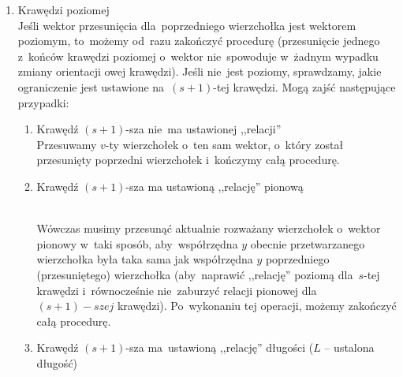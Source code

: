 \documentclass[11pt, a4paper]{article}
\begin{document}
 \begin{enumerate}
  \item Krawędzi poziomej  \\
    Jeśli wektor przesunięcia dla~poprzedniego wierzchołka jest wektorem poziomym, to~możemy od~razu zakończyć
    procedurę (przesunięcie jednego z~końców krawędzi poziomej o~wektor nie~spowoduje w~żadnym wypadku zmiany
    orientacji owej krawędzi).
    Jeśli nie~jest poziomy, sprawdzamy, jakie ograniczenie jest ustawione na~$(s + 1)$-tej krawędzi. Mogą zajść następujące przypadki:
    \begin{enumerate}
     \item Krawędź $(s + 1)$-sza nie~ma ustawionej ,,relacji'' \\
     Przesuwamy $v$-ty wierzchołek o~ten sam wektor, o~który został przesunięty poprzedni wierzchołek i~kończymy całą procedurę.
     \item Krawędź $(s + 1)$-sza ma ustawioną ,,relację'' pionową \\
      \\
     Wówczas musimy przesunąć aktualnie rozważany wierzchołek o~wektor pionowy w~taki sposób, aby~współrzędna $y$ obecnie
     przetwarzanego wierzchołka była taka sama jak współrzędna $y$ poprzedniego (przesuniętego) wierzchołka
     (aby~naprawić ,,relację'' poziomą
     dla~$s$-tej krawędzi i~równocześnie nie~zaburzyć relacji pionowej dla~$(s+1)-szej$ krawędzi). Po~wykonaniu tej operacji,
     możemy zakończyć całą procedurę.
     \item \hypertarget{HorLen}{Krawędź $(s+1)$-sza ma~ustawioną ,,relację'' długości ($L$ -- ustalona długość)} \\
\end{enumerate}
\end{enumerate}
\end{document}
